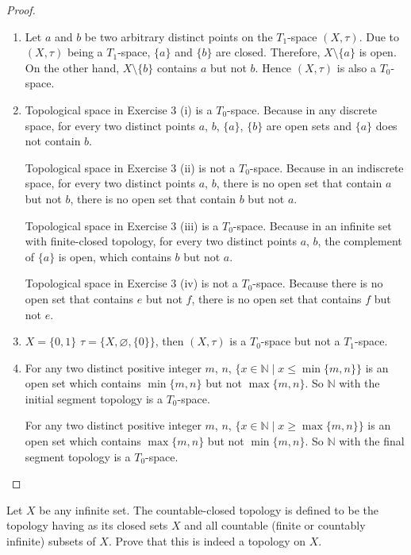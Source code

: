 \begin{proof}
    \begin{enumerate}[label={(\roman*)}]
        \item Let $a$ and $b$ be two arbitrary distinct points on the $T_{1}$-space $(X, \tau)$. Due to $(X, \tau)$ being a $T_{1}$-space, $\{ a \}$ and $\{ b \}$ are closed. Therefore, $X\setminus\{ a \}$ is open. On the other hand, $X\setminus\{ b \}$ contains $a$ but not $b$. Hence $(X, \tau)$ is also a $T_{0}$-space.
        \item Topological space in Exercise 3 (i) is a $T_{0}$-space. Because in any discrete space, for every two distinct points $a$, $b$, $\{ a \}$, $\{ b \}$ are open sets and $\{ a \}$ does not contain $b$.

              Topological space in Exercise 3 (ii) is not a $T_{0}$-space. Because in an indiscrete space, for every two distinct points $a$, $b$, there is no open set that contain $a$ but not $b$, there is no open set that contain $b$ but not $a$.

              Topological space in Exercise 3 (iii) is a $T_{0}$-space. Because in an infinite set with finite-closed topology, for every two distinct points $a$, $b$, the complement of $\{ a \}$ is open, which contains $b$ but not $a$.

              Topological space in Exercise 3 (iv) is not a $T_{0}$-space. Because there is no open set that contains $e$ but not $f$, there is no open set that contains $f$ but not $e$.
        \item $X = \{ 0, 1 \}$ $\tau = \{ X, \varnothing, \{ 0 \} \}$, then $(X, \tau)$ is a $T_{0}$-space but not a $T_{1}$-space.
        \item For any two distinct positive integer $m$, $n$, $\{ x\in\mathbb{N} \mid x\leq \min\{ m, n \} \}$ is an open set which contains $\min\{ m, n \}$ but not $\max\{ m, n \}$. So $\mathbb{N}$ with the initial segment topology is a $T_{0}$-space.

              For any two distinct positive integer $m$, $n$, $\{ x\in\mathbb{N} \mid x\geq \max\{ m, n \} \}$ is an open set which contains $\max\{ m, n \}$ but not $\min\{ m, n \}$. So $\mathbb{N}$ with the final segment topology is a $T_{0}$-space.
    \end{enumerate}
\end{proof}
\newpage

\begin{exercise}
    Let $X$ be any infinite set. The {\color{red}countable-closed topology} is defined to be the topology having as its closed sets $X$ and all countable (finite or countably infinite) subsets of $X$. Prove that this is indeed a topology on $X$.
\end{exercise}

